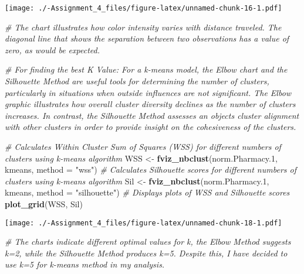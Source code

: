 \documentclass[
]{article}
\newenvironment{Shaded}{\begin{snugshade}}{\end{snugshade}}
\newcommand{\AttributeTok}[1]{\textcolor[rgb]{0.13,0.29,0.53}{#1}}
\newcommand{\CommentTok}[1]{\textcolor[rgb]{0.56,0.35,0.01}{\textit{#1}}}
\newcommand{\FloatTok}[1]{\textcolor[rgb]{0.00,0.00,0.81}{#1}}
\newcommand{\FunctionTok}[1]{\textcolor[rgb]{0.13,0.29,0.53}{\textbf{#1}}}
\newcommand{\NormalTok}[1]{#1}
\newcommand{\OtherTok}[1]{\textcolor[rgb]{0.56,0.35,0.01}{#1}}
\newcommand{\StringTok}[1]{\textcolor[rgb]{0.31,0.60,0.02}{#1}}
\begin{document}
\texttt{[image: ./-Assignment\_4\_files/figure-latex/unnamed-chunk-16-1.pdf]}

\begin{Shaded}
\begin{Highlighting}[]
\CommentTok{\# The chart illustrates how color intensity varies with distance traveled. The diagonal line that shows the separation between two observations has a value of zero, as would be expected.}

\CommentTok{\# For finding the best K Value: For a k{-}means model, the Elbow chart and the Silhouette Method are useful tools for determining the number of clusters, particularly in situations when outside influences are not significant. The Elbow graphic illustrates how overall cluster diversity declines as the number of clusters increases. In contrast, the Silhouette Method assesses an object\textquotesingle{}s cluster alignment with other clusters in order to provide insight on the cohesiveness of the clusters.}
\end{Highlighting}
\end{Shaded}

\begin{Shaded}
\begin{Highlighting}[]
\CommentTok{\# Calculates Within Cluster Sum of Squares (WSS) for different numbers of clusters using k{-}means algorithm}
\NormalTok{WSS }\OtherTok{\textless{}{-}} \FunctionTok{fviz\_nbclust}\NormalTok{(norm.Pharmacy}\FloatTok{.1}\NormalTok{, kmeans, }\AttributeTok{method =} \StringTok{"wss"}\NormalTok{)}
\CommentTok{\# Calculates Silhouette scores for different numbers of clusters using k{-}means algorithm}
\NormalTok{Sil }\OtherTok{\textless{}{-}} \FunctionTok{fviz\_nbclust}\NormalTok{(norm.Pharmacy}\FloatTok{.1}\NormalTok{, kmeans, }\AttributeTok{method =} \StringTok{"silhouette"}\NormalTok{)}
\CommentTok{\# Displays plots of WSS and Silhouette scores}
\FunctionTok{plot\_grid}\NormalTok{(WSS, Sil)}
\end{Highlighting}
\end{Shaded}

\texttt{[image: ./-Assignment\_4\_files/figure-latex/unnamed-chunk-18-1.pdf]}

\begin{Shaded}
\begin{Highlighting}[]
\CommentTok{\# The charts indicate different optimal values for k, the Elbow Method suggests k=2, while the Silhouette Method produces k=5. Despite this, I have decided to use k=5 for k{-}means method in my analysis.}
\end{Highlighting}
\end{Shaded}
\end{document}
